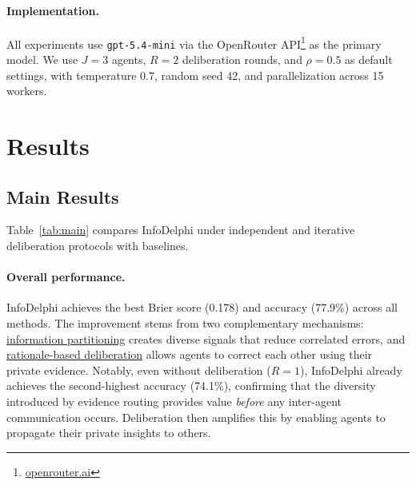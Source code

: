 \documentclass[11pt]{article}
\theoremstyle{plain}
\theoremstyle{definition}
\begin{document}
\paragraph{Implementation.}
All experiments use \texttt{gpt-5.4-mini} via the OpenRouter API\footnote{\href{https://openrouter.ai/}{openrouter.ai}} as the primary model.
We use $J=3$ agents, $R=2$ deliberation rounds, and $\rho=0.5$ as default settings, with temperature 0.7, random seed 42, and parallelization across 15 workers.

\section{Results}
\label{sec:results}

\subsection{Main Results}

Table~\ref{tab:main} compares InfoDelphi under independent and iterative deliberation protocols with baselines.

\paragraph{ Overall performance.}
InfoDelphi achieves the best Brier score (0.178) and accuracy (77.9\%) across all methods.
The improvement stems from two complementary mechanisms: \uline{information partitioning} creates diverse signals that reduce correlated errors, and \uline{rationale-based deliberation} allows agents to correct each other using their private evidence.
Notably, even without deliberation ($R{=}1$), InfoDelphi already achieves the second-highest accuracy (74.1\%), confirming that the diversity introduced by evidence routing provides value \textit{before} any inter-agent communication occurs.
Deliberation then amplifies this by enabling agents to propagate their private insights to others.
\end{document}
